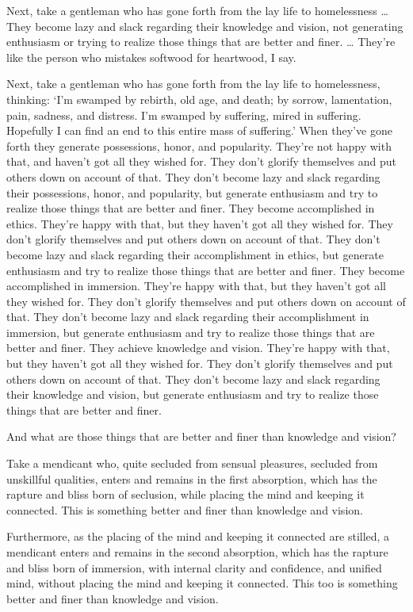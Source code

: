 \documentclass[12pt,openany]{book}%
\begin{document}
Next, take a gentleman who has gone forth from the lay life to homelessness … They become lazy and slack regarding their knowledge and vision, not generating enthusiasm or trying to realize those things that are better and finer. … They’re like the person who mistakes softwood for heartwood, I say. 

Next, take a gentleman who has gone forth from the lay life to homelessness, thinking: ‘I’m swamped by rebirth, old age, and death; by sorrow, lamentation, pain, sadness, and distress. I’m swamped by suffering, mired in suffering. Hopefully I can find an end to this entire mass of suffering.’ When they’ve gone forth they generate possessions, honor, and popularity. They’re not happy with that, and haven’t got all they wished for. They don’t glorify themselves and put others down on account of that. They don’t become lazy and slack regarding their possessions, honor, and popularity, but generate enthusiasm and try to realize those things that are better and finer. They become accomplished in ethics. They’re happy with that, but they haven’t got all they wished for. They don’t glorify themselves and put others down on account of that. They don’t become lazy and slack regarding their accomplishment in ethics, but generate enthusiasm and try to realize those things that are better and finer. They become accomplished in immersion. They’re happy with that, but they haven’t got all they wished for. They don’t glorify themselves and put others down on account of that. They don’t become lazy and slack regarding their accomplishment in immersion, but generate enthusiasm and try to realize those things that are better and finer. They achieve knowledge and vision. They’re happy with that, but they haven’t got all they wished for. They don’t glorify themselves and put others down on account of that. They don’t become lazy and slack regarding their knowledge and vision, but generate enthusiasm and try to realize those things that are better and finer. 

And what are those things that are better and finer than knowledge and vision? 

Take a mendicant who, quite secluded from sensual pleasures, secluded from unskillful qualities, enters and remains in the first absorption, which has the rapture and bliss born of seclusion, while placing the mind and keeping it connected. This is something better and finer than knowledge and vision. 

Furthermore, as the placing of the mind and keeping it connected are stilled, a mendicant enters and remains in the second absorption, which has the rapture and bliss born of immersion, with internal clarity and confidence, and unified mind, without placing the mind and keeping it connected. This too is something better and finer than knowledge and vision. 
\end{document}
